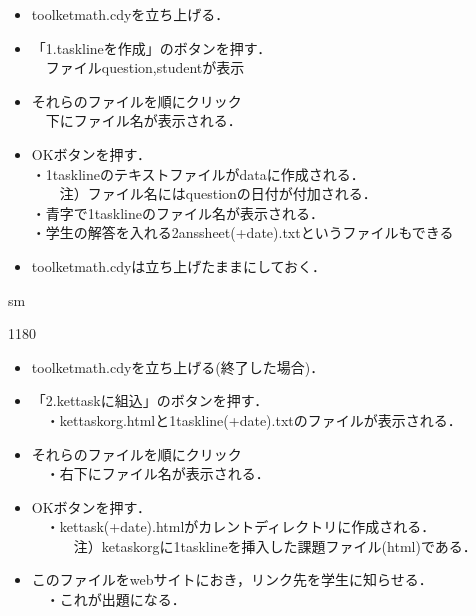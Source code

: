\documentclass[landscape,10pt]{ujarticle}
\newcommand{\slidepage}[1][s]{%
\setcounter{ketpicctra}{18}%
\if#1m \setcounter{ketpicctra}{1}\fi
\hypersetup{linkcolor=black}%

\begin{layer}{118}{0}
\putnotee{122}{-\theketpicctra.05}{\small\thepage/\pageref{pageend}}
\end{layer}\hypersetup{linkcolor=blue}

}
\begin{document}
\begin{itemize}
\item
toolketmath.cdyを立ち上げる．
\item
「1.tasklineを作成」のボタンを押す．\\
　ファイルquestion,studentが表示
\item
それらのファイルを順にクリック\\
　下にファイル名が表示される．
\item
OKボタンを押す．\\
・1tasklineのテキストファイルがdataに作成される．\\
　　注）ファイル名にはquestionの日付が付加される．\\
・青字で1tasklineのファイル名が表示される．\\
・学生の解答を入れる2anssheet(+date).txtというファイルもできる
\item
toolketmath.cdyは立ち上げたままにしておく．
\end{itemize}



\vspace*{18mm}

\slidepage
\begin{itemize}
\item
toolketmath.cdyを立ち上げる(終了した場合)．
\item
「2.kettaskに組込」のボタンを押す．\\
　・kettaskorg.htmlと1taskline(+date).txtのファイルが表示される．
\item
それらのファイルを順にクリック\\
　・右下にファイル名が表示される．
\item
OKボタンを押す．\\
　・kettask(+date).htmlがカレントディレクトリに作成される．\\
　　　注）ketaskorgに1tasklineを挿入した課題ファイル(html)である．
\item
このファイルをwebサイトにおき，リンク先を学生に知らせる．\\
　・これが出題になる．
\end{itemize}



\vspace*{18mm}
\end{document}
